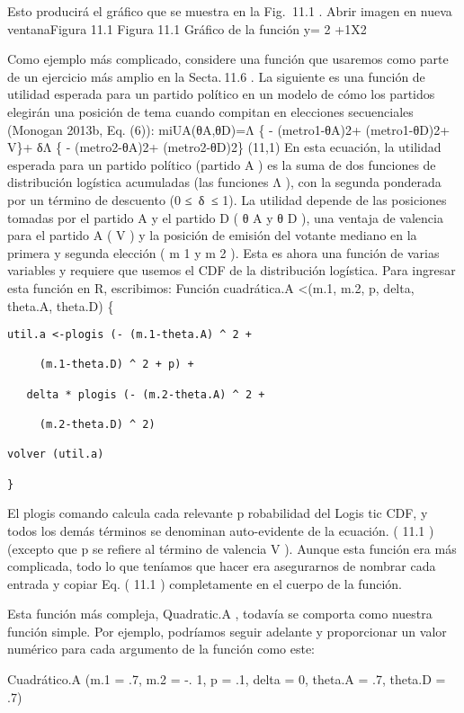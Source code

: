 \documentclass[
]{book}
\begin{document}
Esto producirá el gráfico que se muestra en la Fig.  11.1 .
Abrir imagen en nueva ventanaFigura 11.1
Figura 11.1
Gráfico de la función y= 2 +1X2

Como ejemplo más complicado, considere una función que usaremos como parte de un ejercicio más amplio en la Secta. 11.6 . La siguiente es una función de utilidad esperada para un partido político en un modelo de cómo los partidos elegirán una posición de tema cuando compitan en elecciones secuenciales (Monogan 2013b, Eq. (6)):
miUA(θA,θD)=Λ \{ - (metro1-θA)2+ (metro1-θD)2+ V\}+ δΛ \{ - (metro2-θA)2+ (metro2-θD)2\}
(11,1)
En esta ecuación, la utilidad esperada para un partido político (partido A ) es la suma de dos funciones de distribución logística acumuladas (las funciones Λ ), con la segunda ponderada por un término de descuento (0 ≤  δ  ≤ 1). La utilidad depende de las posiciones tomadas por el partido A y el partido D ( θ A y θ D ), una ventaja de valencia para el partido A ( V ) y la posición de emisión del votante mediano en la primera y segunda elección ( m 1 y m 2 ). Esta es ahora una función de varias variables y requiere que usemos el CDF de la distribución logística. Para ingresar esta función en R, escribimos:
Función cuadrática.A \textless(m.1, m.2, p, delta, theta.A, theta.D) \{

\begin{verbatim}
util.a <-plogis (- (m.1-theta.A) ^ 2 +

     (m.1-theta.D) ^ 2 + p) +

   delta * plogis (- (m.2-theta.A) ^ 2 +

     (m.2-theta.D) ^ 2)

volver (util.a)

}
\end{verbatim}

El plogis comando calcula cada relevante p robabilidad del Logis tic CDF, y todos los demás términos se denominan auto-evidente de la ecuación. ( 11.1 ) (excepto que p se refiere al término de valencia V ). Aunque esta función era más complicada, todo lo que teníamos que hacer era asegurarnos de nombrar cada entrada y copiar Eq. ( 11.1 ) completamente en el cuerpo de la función.

Esta función más compleja, Quadratic.A , todavía se comporta como nuestra función simple. Por ejemplo, podríamos seguir adelante y proporcionar un valor numérico para cada argumento de la función como este:

Cuadrático.A (m.1 = .7, m.2 = -. 1, p = .1, delta = 0, theta.A = .7, theta.D = .7)
\end{document}
